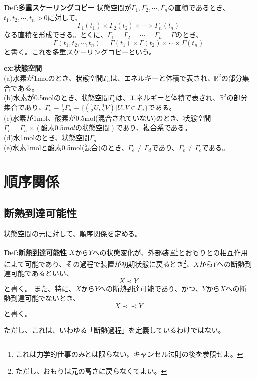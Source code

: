 \documentclass[a4paper,11pt]{jsarticle}
\begin{document}
\begin{itembox}[l]{\textbf{Def:多重スケーリングコピー}}
    状態空間が$\Gamma_1,\Gamma_2,\cdots,\Gamma_n$の直積であるとき、$t_1,t_2,\cdots,t_n>0$に対して、
    \begin{equation}
        \Gamma_1(t_1) \times \Gamma_2(t_2) \times \cdots \times \Gamma_n(t_n)
    \end{equation}
    なる直積を形成できる。とくに、$\Gamma_1=\Gamma_2=\cdots=\Gamma_n=\Gamma$のとき、
    \begin{equation}
        \Gamma(t_1,t_2,\cdots,t_n)=\Gamma(t_1) \times \Gamma(t_2) \times \cdots \times \Gamma(t_n)
    \end{equation}
    と書く。これを多重スケーリングコピーという。
\end{itembox}

\textbf{ex:状態空間}\\
(a)水素が1molのとき、状態空間$\Gamma_a$は、エネルギーと体積で表され、$\mathbb{{R}}^2$の部分集合である。\\
(b)水素が0.5molのとき、状態空間$\Gamma_b$は、エネルギーと体積で表され、$\mathbb{{R}}^2$の部分集合であり、$\Gamma_b=\frac{1}{2}\Gamma_a=\{(\frac{1}{2}U,\frac{1}{2}V)|U,V \in \Gamma_a\}$である。\\
(c)水素が1mol、酸素が0.5mol(混合されていない)のとき、状態空間$\Gamma_c=\Gamma_a \times (酸素0.5molの状態空間)$であり、複合系である。\\
(d)水1molのとき、状態空間$\Gamma_d$\\
(e)水素1molと酸素0.5mol(混合)のとき、$\Gamma_e\neq \Gamma_d$であり、$\Gamma_e\neq \Gamma_c$である。\\

\section{順序関係}
\subsection{断熱到達可能性}
状態空間の元に対して、順序関係を定める。
\begin{itembox}[l]{\textbf{Def:断熱到達可能性}}
    $X$から$Y$への状態変化が、外部装置\footnote{これは力学的仕事のみとは限らない。キャンセル法則の後を参照せよ。}とおもりとの相互作用によて可能であり、その過程で装置が初期状態に戻るとき\footnote{ただし、おもりは元の高さに戻らなくてよい。}、$X$から$Y$への断熱到達可能であるといい、
    \begin{equation}
        X \prec Y
    \end{equation}
    と書く。
    また、特に、$X$から$Y$への断熱到達可能であり、かつ、$Y$から$X$への断熱到達可能でないとき、
    \begin{equation}
        X \prec \prec Y
    \end{equation}
    と書く。
\end{itembox}
ただし、これは、いわゆる「断熱過程」を定義しているわけではない。\\
\end{document}
